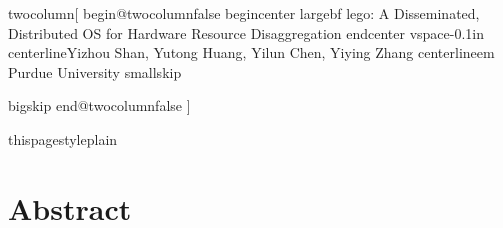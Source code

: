 \documentclass[10pt,times,twocolumn]{z2-article}
\begin{document}
\pagestyle{plain}


%




\newcommand{\mm}{mm$^2$}
\newcommand{\figtitle}[1]{\textbf{#1}}
\newcommand{\us}{$\mu$s}
\newcommand{\yilun}[1]{{\color{green}\textbf{#1}}}

\newcommand{\laura}[1]{{\color{pink}\textbf{#1}}}
\newcommand{\arup}[1]{{\color{yellow}\textbf{#1}}}
\newcommand{\hungwei}[1]{{\color{purple}\textbf{#1}}}


\newcommand{\note}[2]{\fixme{$\ll$ #1 $\gg$ #2}}

\newcommand{\myitem}[1]{\item \textbf{#1}}

\newcommand{\yiying}[1]  {\noindent{\color{orange} {\bf \fbox{Yiying}     {\it#1}}}}
\newcommand{\yizhou}[1]  {\noindent{\color{blue} {\bf \fbox{Yizhou}     {\it#1}}}}

\newcommand{\fixme}[1]   {\noindent{\color{red} {\bf \fbox{FIXME}     {\it#1}}}}

twocolumn[
begin{@twocolumnfalse}
begin{center}
{largebf lego: A Disseminated, Distributed OS for Hardware Resource Disaggregation}
end{center}
vspace{-0.1in}
centerline{Yizhou Shan, Yutong Huang, Yilun Chen, Yiying Zhang}
centerline{em Purdue University}
smallskip

bigskip
end{@twocolumnfalse}
]

thispagestyle{plain}

\section*{Abstract}
\end{document}
